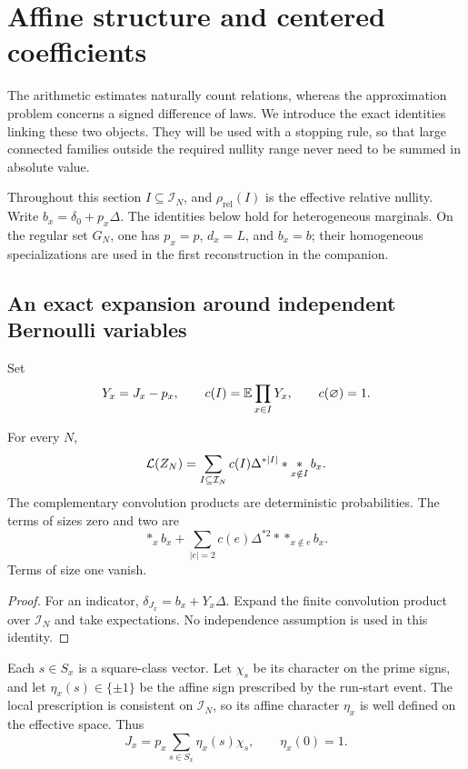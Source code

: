 \section{Affine structure and centered coefficients}
\label{p1:alg:section}

The arithmetic estimates naturally count relations, whereas the
approximation problem concerns a signed difference of laws.
We introduce the exact identities linking these two objects.
They will be used with a stopping rule, so that large connected
families outside the required nullity range never need to be
summed in absolute value.

Throughout this section $I\subseteq\mathcal I_N$, and
$\rho_{\mathrm{rel}}(I)$ is the effective relative nullity.
Write $b_x=\delta_0+p_x\Delta$. The identities below hold for
heterogeneous marginals. On the regular set $G_N$, one has $p_x=p$,
$d_x=L$, and $b_x=b$; their homogeneous specializations are used in
the first reconstruction in the companion.

\subsection{An exact expansion around independent Bernoulli variables}

Set
\[
 Y_x=J_x-p_x,\qquad c(I)=\mathbb E\prod_{x\in I}Y_x,
 \qquad c(\varnothing)=1.
\]

\begin{proposition}
\label{p1:alg:centred}
For every \(N\),
\begin{equation}
 \mathcal L(Z_N)=\sum_{I\subseteq\mathcal I_N}
       c(I)\Delta^{*|I|}*\mathop{*}_{x\notin I}b_x .
 \label{p1:alg:centred-identity}
\end{equation}
The complementary convolution products are deterministic probabilities.
The terms of sizes zero and two are
\[
 \mathop{*}_{x}b_x+
 \sum_{|e|=2}c(e)\Delta^{*2}*\mathop{*}_{x\notin e}b_x.
\]
Terms of size one vanish.
\end{proposition}

\begin{proof}
For an indicator,
\(\delta_{J_x}=b_x+Y_x\Delta\). Expand the finite convolution
product over \(\mathcal I_N\) and take expectations. No independence
assumption is used in this identity.
\end{proof}

Each \(s\in S_x\) is a square-class vector. Let
\(\chi_s\) be its character on the prime signs, and let
\(\eta_x(s)\in\{\pm1\}\) be the affine sign prescribed by
the run-start event. The local prescription is consistent on
\(\mathcal I_N\), so its affine character \(\eta_x\) is well defined
on the effective space. Thus
\[
 J_x=p_x\sum_{s\in S_x}\eta_x(s)\chi_s,\qquad \eta_x(0)=1.
\]

